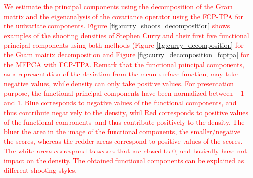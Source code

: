 \textcolor{red}{We estimate the principal components using the decomposition of the Gram matrix and the eigenanalysis of the covariance operator using the FCP-TPA for the univariate components. Figure \ref{fig:curry_shoots_decomposition} shows examples of the shooting densities of Stephen Curry and their first five functional principal components using both methods (Figure \ref{fig:curry_decomposition} for the Gram matrix decomposition and Figure \ref{fig:curry_decomposition_fcptpa} for the MFPCA with FCP-TPA. Remark that the functional principal components, as a representation of the deviation from the mean surface function, may take negative values, while density can only take positive values. For presentation purpose, the functional principal components have been normalized between $-1$ and $1$. Blue corresponds to negative values of the functional components, and thus contribute negatively to the density, whil Red corresponds to positive values of the functional components, and thus contribute positively to the density. The bluer the area in the image of the functional components, the smaller/negative the scores, whereas the redder areas correspond to positive values of the scores. The white areas correspond to scores that are closed to $0$, and basically have not impact on the density. The obtained functional components can be explained as different shooting styles.}

